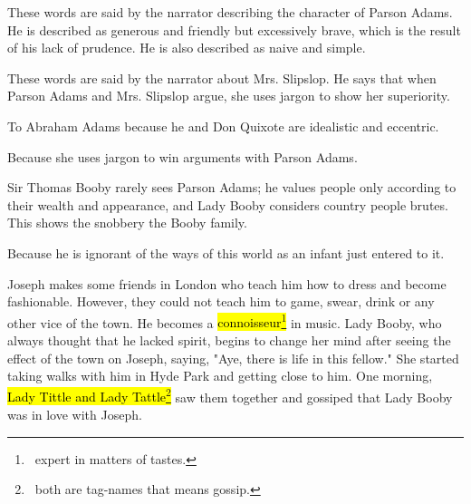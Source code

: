 \documentclass[12pt, a4paper]{article}
\begin{document}



These words are said by the narrator describing the character of Parson Adams.
He is described as generous and friendly but excessively brave, which is the result of
his lack of prudence. He is also described as naive and simple.


These words are said by the narrator about Mrs. Slipslop. He says that when Parson Adams and 
Mrs. Slipslop argue, she uses jargon to show her superiority.


To Abraham Adams because he and Don Quixote are idealistic and eccentric.


Because she uses jargon to win arguments with Parson Adams.



Sir Thomas Booby rarely sees Parson Adams; he values people only according to their wealth and appearance, and Lady Booby
considers country people brutes. This shows the snobbery the Booby family.



Because he is ignorant of the ways of this world as an infant just entered to it.

\enlargethispage{2\baselineskip}

\ind Joseph makes some friends in London who teach him how to dress and become 
fashionable. However, they could not teach him to game, swear, drink or
any other vice of the town. He becomes a \hl{connoisseur\footnote{\, 
expert in matters of tastes.}} in music. Lady Booby, who always thought that 
he lacked spirit, begins to change her mind after seeing the effect of the town
on Joseph, saying, "Aye, there is life in this fellow." She started taking walks
with him in Hyde Park and getting close to him. One morning, \hl{Lady Tittle and Lady
Tattle\footnote{\, both are tag-names that means gossip.}} saw them together and
gossiped that Lady Booby was in love with Joseph.
\end{document}
